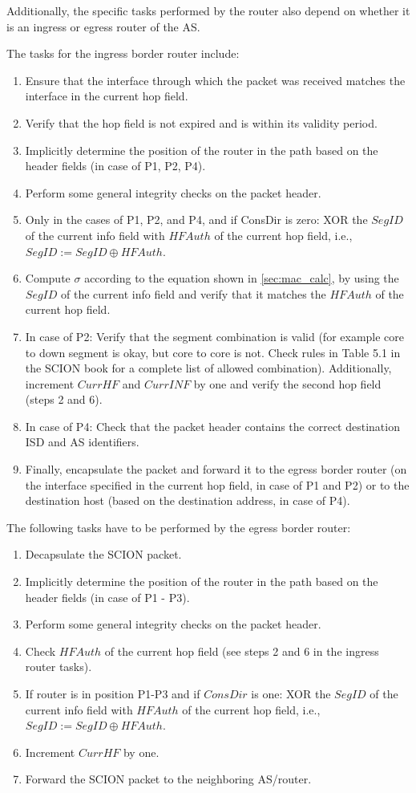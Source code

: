 Additionally, the specific tasks performed by the router also depend on whether it is an ingress or egress router of the AS.

The tasks for the ingress border router include:
\begin{enumerate}
    \item Ensure that the interface through which the packet was received matches the interface in the current hop field.
    \item Verify that the hop field is not expired and is within its validity period.
    \item Implicitly determine the position of the router in the path based on the header fields (in case of P1, P2, P4).
    \item Perform some general integrity checks on the packet header.
    \item Only in the cases of P1, P2, and P4, and if ConsDir is zero: XOR the $SegID$ of the current info field with $HFAuth$ of the current hop field, i.e., $SegID := SegID \oplus HFAuth$.
    \item Compute $\sigma$ according to the equation shown in \cref{sec:mac_calc}, by using the $SegID$ of the current info field and verify that it matches the $HFAuth$ of the current hop field.
    \item In case of P2: Verify that the segment combination is valid (for example core to down segment is okay, but core to core is not. Check rules in Table 5.1 in the SCION book \cite{Perrig2022} for a complete list of allowed combination).
    Additionally, increment $CurrHF$ and $CurrINF$ by one and verify the second hop field (steps 2 and 6).
    \item In case of P4: Check that the packet header contains the correct destination ISD and AS identifiers.
    \item Finally, encapsulate the packet and forward it to the egress border router (on the interface specified in the current hop field, in case of P1 and P2) or to the destination host (based on the destination address, in case of P4).
\end{enumerate}


The following tasks have to be performed by the egress border router:
\begin{enumerate}
    \item Decapsulate the SCION packet.
    \item Implicitly determine the position of the router in the path based on the header fields (in case of P1 - P3).
    \item Perform some general integrity checks on the packet header.
    \item Check $HFAuth$ of the current hop field (see steps 2 and 6 in the ingress router tasks).
    \item If router is in position P1-P3 and if $ConsDir$ is one: XOR the $SegID$ of the current info field with $HFAuth$ of the current hop field, i.e., $SegID := SegID \oplus HFAuth$.
    \item Increment $CurrHF$ by one.
    \item Forward the SCION packet to the neighboring AS/router.
\end{enumerate}


